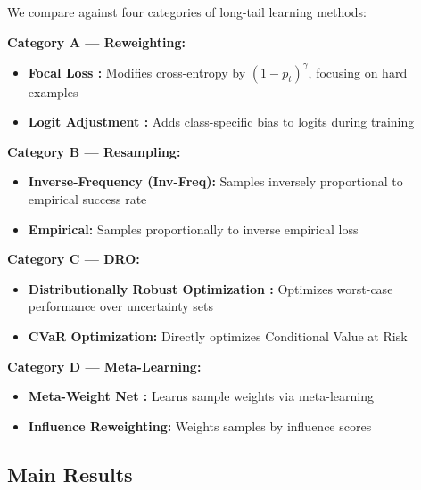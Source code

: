 \documentclass[11pt, a4paper, oneside]{article}
\theoremstyle{plain}
\theoremstyle{break}
\theoremstyle{plain}
\theoremstyle{breakdef}
\theoremstyle{plain}
\theoremstyle{breakrem}
\theoremstyle{plain}
\theoremstyle{breakrem}
\begin{document}
We compare against four categories of long-tail learning methods:

\textbf{Category A --- Reweighting:}
\begin{itemize}
    \item \textbf{Focal Loss \cite{lin2017focal}:} Modifies cross-entropy by $(1 - p_t)^\gamma$, focusing on hard examples
    \item \textbf{Logit Adjustment \cite{menon2021longtail}:} Adds class-specific bias to logits during training
\end{itemize}

\textbf{Category B --- Resampling:}
\begin{itemize}
    \item \textbf{Inverse-Frequency (Inv-Freq):} Samples inversely proportional to empirical success rate
    \item \textbf{Empirical:} Samples proportionally to inverse empirical loss
\end{itemize}

\textbf{Category C --- DRO:}
\begin{itemize}
    \item \textbf{Distributionally Robust Optimization \cite{sinha2018certifiable}:} Optimizes worst-case performance over uncertainty sets
    \item \textbf{CVaR Optimization:} Directly optimizes Conditional Value at Risk
\end{itemize}

\textbf{Category D --- Meta-Learning:}
\begin{itemize}
    \item \textbf{Meta-Weight Net \cite{shu2019metaweight}:} Learns sample weights via meta-learning
    \item \textbf{Influence Reweighting:} Weights samples by influence scores
\end{itemize}

\subsection{Main Results}
\end{document}
